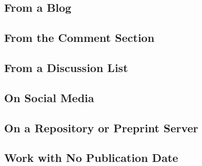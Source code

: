\documentclass{article}
\begin{document}
\subsection{From a Blog} %
\label{sub:from_a_blog}
\begin{refsection}
	\nocite{Hayes:vy}
	\printbibliography[heading=none]
\end{refsection}
\subsection{From the Comment Section} %
\label{sub:from_the_comment_section}
\begin{refsection}
	\nocite{Max-the-Pen:ve}
	\printbibliography[heading=none]
\end{refsection}
\subsection{From a Discussion List} %
\label{sub:from_a_discussion_list}
\begin{refsection}
	\nocite{Grooms:tx}
	\printbibliography[heading=none]
\end{refsection}
\subsection{On Social Media} %
\label{sub:on_social_media}
\begin{refsection}
	\nocite{Chaucer-Doth-Tweet:tx,Lilly:ui,MacLeod:wm,Modern-Language-Association:ub,Ng:wg,Thomas:vq,World-Wildlife-Fund:vz}
	\printbibliography[heading=none]
\end{refsection}
\subsection{On a Repository or Preprint Server} %
\label{sub:on_a_repository_or_preprint_server}
\begin{refsection}
	\nocite{Wang:wj,Werner:vh}
	\printbibliography[heading=none]
\end{refsection}
\subsection{Work with No Publication Date} %
\label{sub:work_with_no_publication_date}
\begin{refsection}
	\nocite{Beaton:vx}
	\printbibliography[heading=none]
\end{refsection}
\end{document}
